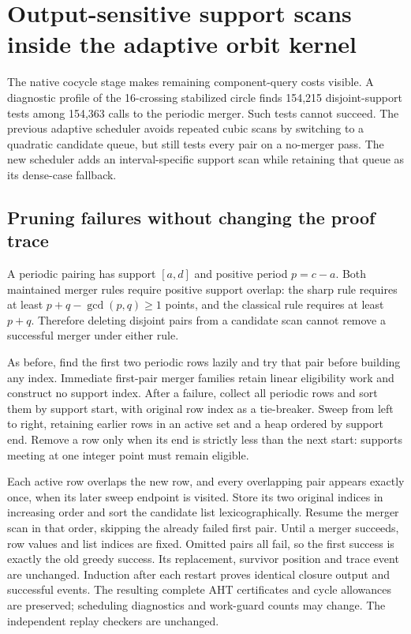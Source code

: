 \section{Output-sensitive support scans inside the adaptive orbit kernel}
\label{sec:orbit-support}

The native cocycle stage makes remaining component-query costs visible.
A diagnostic profile of the 16-crossing stabilized circle finds 154,215
disjoint-support tests among 154,363 calls to the periodic merger. Such
tests cannot succeed. The previous adaptive scheduler avoids repeated
cubic scans by switching to a quadratic candidate queue, but still tests
every pair on a no-merger pass. The new scheduler adds an interval-specific
support scan while retaining that queue as its dense-case fallback.

\subsection{Pruning failures without changing the proof trace}

A periodic pairing has support $[a,d]$ and positive period $p=c-a$.
Both maintained merger rules require positive support overlap: the sharp
rule requires at least $p+q-\gcd(p,q)\ge1$ points, and the classical rule
requires at least $p+q$. Therefore deleting disjoint pairs from a candidate
scan cannot remove a successful merger under either rule.

As before, find the first two periodic rows lazily and try that pair before
building any index. Immediate first-pair merger families retain linear
eligibility work and construct no support index. After a failure, collect
all periodic rows and sort them by support start, with original row index
as a tie-breaker. Sweep from left to right, retaining earlier rows in an
active set and a heap ordered by support end. Remove a row only when its
end is strictly less than the next start: supports meeting at one integer
point must remain eligible.

Each active row overlaps the new row, and every overlapping pair appears
exactly once, when its later sweep endpoint is visited. Store its two
original indices in increasing order and sort the candidate list
lexicographically. Resume the merger scan in that order, skipping the
already failed first pair. Until a merger succeeds, row values and list
indices are fixed. Omitted pairs all fail, so the first success is exactly
the old greedy success. Its replacement, survivor position and trace event
are unchanged. Induction after each restart proves identical closure output
and successful events. The resulting complete AHT certificates and cycle
allowances are preserved; scheduling diagnostics and work-guard counts may
change. The independent replay checkers are unchanged.

